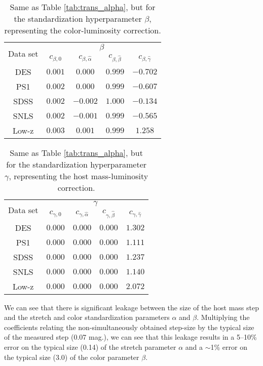 \begin{table}[htbp]
    \centering
    \begin{tabular}{ccccc}\toprule
        \multirow{2}{*}{Data set} &
        \multicolumn{4}{c}{$\beta$}\\
        {} &  $c_{\beta, 0}$ &  $c_{\beta,\hat{\alpha}}$ & $c_{\beta,\hat{\beta}}$ & $c_{\beta,\hat{\gamma}}$\\\midrule
        DES & $0.001$ & $0.000$ & $0.999$ & $-0.702$\\
        PS1 & $0.002$ & $0.000$ & $0.999$ & $-0.607$\\
        SDSS & $0.002$ & $-0.002$ & $1.000$ & $-0.134$\\
        SNLS & $0.002$ & $-0.001$ & $0.999$ & $-0.565$\\
        Low-z & $0.003$ & $0.001$ & $0.999$ & $1.258$\\
    \bottomrule
    \end{tabular}
    \caption{Same as Table \ref{tab:trans_alpha}, but for the standardization hyperparameter $\beta$, representing the color-luminosity correction.}
    \label{tab:trans_beta}
\end{table}

\begin{table}[htbp]
    \centering
    \begin{tabular}{ccccc}\toprule
        \multirow{2}{*}{Data set} &
        \multicolumn{4}{c}{$\gamma$}\\
        {} &  $c_{\gamma, 0}$ &  $c_{\gamma,\hat{\alpha}}$ & $c_{\gamma,\hat{\beta}}$ & $c_{\gamma,\hat{\gamma}}$ \\\midrule
        DES & $0.000$ & $0.000$ & $0.000$ & $1.302$\\
        PS1 & $0.000$ & $0.000$ & $0.000$ & $1.111$\\
        SDSS & $0.000$ & $0.000$ & $0.000$ & $1.237$\\
        SNLS & $0.000$ & $0.000$ & $0.000$ & $1.140$\\
        Low-z & $0.000$ & $0.000$ & $0.000$ & $2.072$\\
    \bottomrule
    \end{tabular}
    \caption{Same as Table \ref{tab:trans_alpha}, but for the standardization hyperparameter $\gamma$, representing the host mass-luminosity correction.}
    \label{tab:trans_gamma}
\end{table}

We can see that there is significant leakage between the size of the host mass step and the stretch and color standardization parameters $\alpha$ and $\beta$. Multiplying the coefficients relating the non-simultaneously obtained step-size by the typical size of the measured step (0.07 mag.), we can see that this leakage results in a 5--10\% error on the typical size (0.14) of the stretch parameter $\alpha$ and a $\sim$1\% error on the typical size (3.0) of the color parameter $\beta$.

